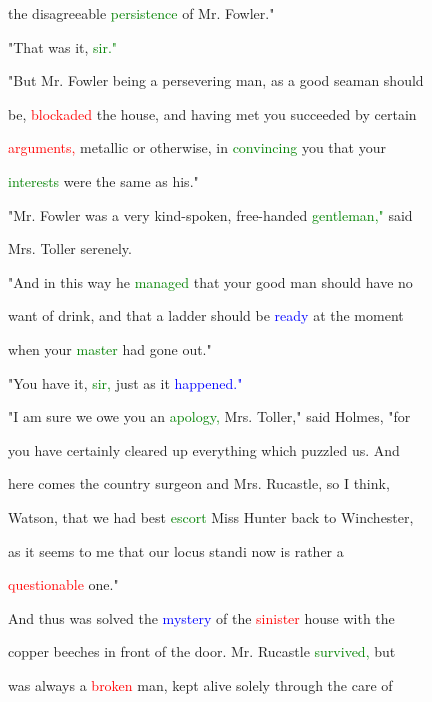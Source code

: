  the disagreeable \textcolor{green}{persistence} of Mr. Fowler."



 "That was it, \textcolor{green}{sir."}



 "But Mr. Fowler being a persevering man, as a \textcolor{BurntOrange}{good} seaman should

 be, \textcolor{red}{blockaded} the house, and having met you \textcolor{BurntOrange}{succeeded} by certain

 \textcolor{red}{arguments,} metallic or otherwise, in \textcolor{green}{convincing} you that your

 \textcolor{green}{interests} were the same as his."



 "Mr. Fowler was a very kind-spoken, free-handed \textcolor{green}{gentleman,"} said

 Mrs. Toller serenely.



 "And in this way he \textcolor{green}{managed} that your \textcolor{BurntOrange}{good} man should have no

 want of drink, and that a ladder should be \textcolor{blue}{ready} at the moment

 when your \textcolor{green}{master} had gone out."



 "You have it, \textcolor{green}{sir,} just as it \textcolor{blue}{happened."}



 "I am sure we owe you an \textcolor{green}{apology,} Mrs. Toller," said Holmes, "for

 you have certainly cleared up everything which puzzled us. And

 here comes the country surgeon and Mrs. Rucastle, so I think,

 Watson, that we had best \textcolor{green}{escort} Miss \textcolor{BurntOrange}{Hunter} back to Winchester,

 as it seems to me that our locus standi now is rather a

 \textcolor{red}{questionable} one."



 And thus was solved the \textcolor{blue}{mystery} of the \textcolor{red}{sinister} house with the

 copper beeches in front of the door. Mr. Rucastle \textcolor{green}{survived,} but

 was always a \textcolor{red}{broken} man, kept \textcolor{BurntOrange}{alive} solely through the care of

